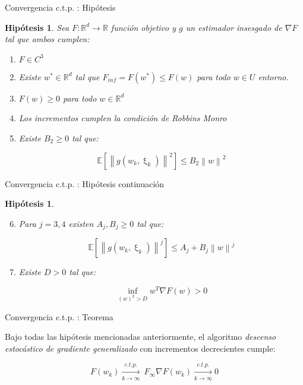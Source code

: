 \documentclass{beamer}
\newtheorem{hyp}[theorem]{Hip\'otesis}
\newcommand{\R}{{\mathbb{R}}}
\newcommand{\norm}[1]{\left\lVert#1\right\rVert}
\newcommand{\expectation}[1]{\mathbb{E} \left[#1\right]}
\begin{document}
\begin{frame}{Convergencia c.t.p. : Hip\'otesis}
\begin{hyp}
	Sea $F: \R^d \rightarrow \R$  funci\'on objetivo y  $g$ un estimador insesgado de $\nabla F$ tal que ambos cumplen:
	
	\begin{enumerate}
		\item $F \in C^3$
		\item Existe $w^* \in \R^d$ tal que $F_{inf} = F(w^*) \leq F(w)$ para todo $w \in U$ entorno.
		\item $F(w) \geq 0$ para todo $w \in \R^d$
		\item Los incrementos cumplen la \textit{condici\'on de Robbins Monro}
		\item Existe $B_2 \geq 0$ tal que:
		
		\begin{equation*}
		\expectation{\norm{g(w_k, \upxi_{k})}^2} \leq B_2 \norm{w}^2
		\end{equation*}		
		\end{enumerate}
\end{hyp}	
\end{frame}
\begin{frame}{Convergencia c.t.p. : Hip\'otesis continuaci\'on}
\begin{hyp}
	\begin{enumerate}
		\setcounter{enumi}{5}
		\item Para $j=3, 4$ existen $A_j,B_j \geq 0$ tal que:
		
		\begin{equation*}
		\expectation{\norm{g(w_k, \upxi_{k})}^j} \leq A_j + B_j \norm{w}^j
		\end{equation*}
		
		\item  Existe $D > 0$ tal que:
		
		\begin{equation*}
		\inf\limits_{(w)^2 > D} {w^T \nabla F(w)} >0
		\end{equation*}
	\end{enumerate}
	
\end{hyp}
\end{frame}

\begin{frame}{Convergencia c.t.p. : Teorema}
\begin{theorem}
	Bajo todas las hip\'otesis mencionadas anteriormente, el algoritmo \textit{descenso estoc\'astico de gradiente generalizado} con incrementos decrecientes cumple:
	
	\begin{subequations}
		\begin{equation*}
		F(w_k) \xrightarrow[k \rightarrow \infty]{c.t.p.} \ F_{\infty}
		\end{equation*}
		\begin{equation*}
		\nabla F(w_k) \xrightarrow[k \rightarrow \infty]{c.t.p.} 0
		\end{equation*}
	\end{subequations}
\end{theorem}	
\end{frame}
\end{document}
